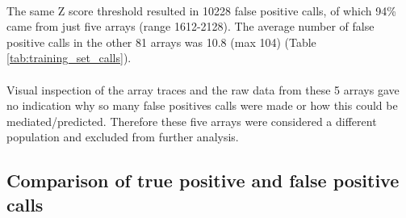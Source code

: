 \paragraph*{}
The same Z score threshold resulted in 10228 false positive calls, of which 94\% came from just five arrays (range 1612-2128). The average number of false positive calls in the other 81 arrays was 10.8 (max 104) (Table \ref{tab:training_set_calls}).
\paragraph*{}
Visual inspection of the array traces and the raw data from these 5 arrays gave no indication why so many false positives calls were made or how this could be mediated/predicted. Therefore these five arrays were considered a different population and excluded from further analysis.
\subsection{Comparison of true positive and false positive calls}
\begin{table}[]
\centering
\caption[Calls made in 81 training cases after removal of outliers]{The calls made in 81 training cases using a range of Z score thresholds. The true positive call was missed in at least 5 cases across all thresholds, with a false positive call made in at least 1 in 4 cases. The number of false positive calls, and the average number of calls made decreased as the Z score threshold increased.}
\label{tab:training_set_calls}
\end{table}
